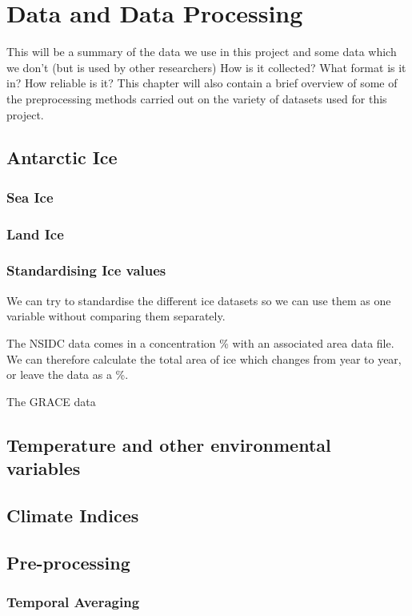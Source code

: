 \documentclass[../main.tex]{subfiles}
\begin{document}
\chapter{Data and Data Processing}
\label{chap:data}
This will be a summary of the data we use in this project and some data which we don't (but is used by other researchers)
How is it collected? What format is it in?
How reliable is it?
This chapter will also contain a brief overview of some of the preprocessing methods carried out on the variety of datasets used for this project. 

\section{Antarctic Ice}
\subsection*{Sea Ice}
\subsection*{Land Ice}
\subsection*{Standardising Ice values}

We can try to standardise the different ice datasets so we can use them as one variable without comparing them separately.

The NSIDC data comes in a concentration \% with an associated area data file. We can therefore calculate the total area of ice which changes from year to year, or leave the data as a \%.

The GRACE data



\section{Temperature and other environmental variables}

\section{Climate Indices}

\section{Pre-processing}
\subsection*{Temporal Averaging}
\end{document}
